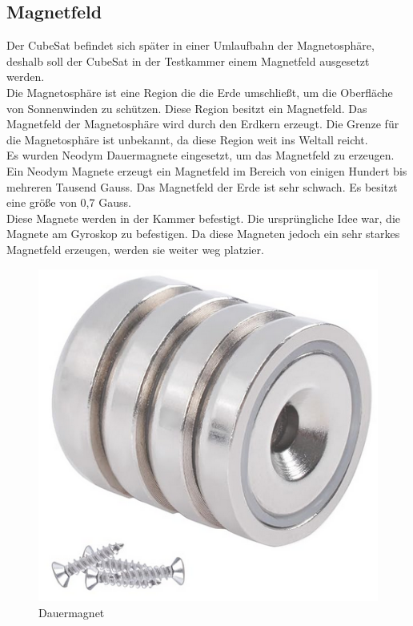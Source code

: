 \subsection{Magnetfeld}\label{sec:Magnetfeld}
Der CubeSat befindet sich später in einer Umlaufbahn der Magnetosphäre, deshalb soll der CubeSat in der Testkammer einem Magnetfeld ausgesetzt werden.\\
\vspace{5mm}
Die Magnetosphäre ist eine Region die die Erde umschließt, um die Oberfläche von Sonnenwinden zu schützen. Diese Region besitzt ein Magnetfeld. Das Magnetfeld der Magnetosphäre wird durch den Erdkern erzeugt. Die Grenze für die Magnetosphäre ist unbekannt, da diese Region weit ins Weltall reicht.\\
\vspace{5mm}
Es wurden Neodym Dauermagnete\autocite{Magnet} eingesetzt, um das Magnetfeld zu erzeugen.\\
\vspace{3mm}
Ein Neodym Magnete erzeugt ein Magnetfeld im Bereich von einigen Hundert bis mehreren Tausend Gauss. Das Magnetfeld der Erde ist sehr schwach. Es besitzt eine größe von 0,7 Gauss.\\
\vspace{3mm}
Diese Magnete werden in der Kammer befestigt. Die ursprüngliche Idee war, die Magnete am Gyroskop zu befestigen. Da diese Magneten jedoch ein sehr starkes Magnetfeld erzeugen, werden sie weiter weg platzier.\\
\vspace{5mm}
\begin{figure}[H]
    \centering
    \includegraphics[scale=0.4]{image/Magnet.png}
    \caption{Dauermagnet\autocite{Beispielbild_Magnet}}
    \label{fig:enter-label}
\end{figure}

